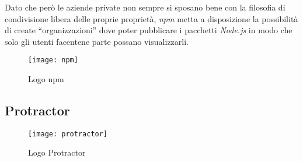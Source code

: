 Dato che però le aziende private non sempre si sposano bene con la filosofia di
condivisione libera delle proprie proprietà, \textit{npm} metta a disposizione
la possibilità di create ``organizzazioni'' dove poter pubblicare i pacchetti
\textit{Node.js} in modo che solo gli utenti facentene parte possano
visualizzarli.

\begin{figure}[h]
\begin{center}
\texttt{[image: npm]}
\caption{Logo npm}
\label{fig:npm_logo}
\end{center}
\end{figure}

\subsection{Protractor}

\begin{figure}[H]
\begin{center}
\texttt{[image: protractor]}
\caption{Logo Protractor}
\label{fig:protractor_logo}
\end{center}
\end{figure}
